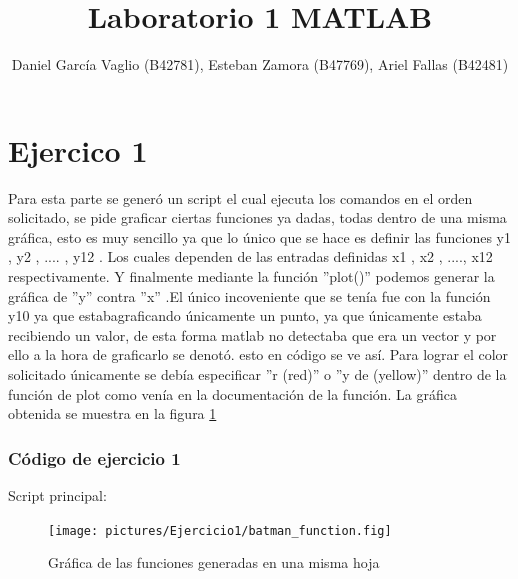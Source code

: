 \documentclass[12pt,letterpaper]{article}
\begin{document}
\title{Laboratorio 1 MATLAB}
\author{Daniel García Vaglio (B42781), Esteban Zamora (B47769), Ariel Fallas (B42481)}
\maketitle

\section{Ejercico 1}


Para esta parte se generó un script el cual ejecuta los comandos en el orden solicitado, se pide graficar ciertas funciones ya dadas, todas dentro de una misma gráfica, esto es muy sencillo ya que lo único que se hace es definir las funciones y1 , y2 , .... , y12 . Los cuales dependen de las entradas definidas x1 , x2 , ...., x12 respectivamente. Y finalmente mediante la función ''plot()'' podemos generar la gráfica de ''y'' contra ''x'' .El único incoveniente que se tenía fue con la función y10 ya que estabagraficando únicamente un punto, ya que únicamente estaba recibiendo un valor, de esta forma matlab no detectaba que era un vector y por ello a la hora de graficarlo se denotó.  esto en código se ve así.
Para lograr el color solicitado únicamente se debía especificar ''r (red)'' o ''y de (yellow)'' dentro de la función de plot como venía en la documentación de la función. La gráfica obtenida se muestra en la figura \ref{fig:batman}

\subsubsection{Código de ejercicio 1}


Script principal:



\begin{figure}[ht!]
	\centering
	\texttt{[image: pictures/Ejercicio1/batman\_function.fig]}
	\caption{Gráfica de las funciones generadas en una misma hoja}
	\label{fig:batman}
\end{figure} 
\end{document}
